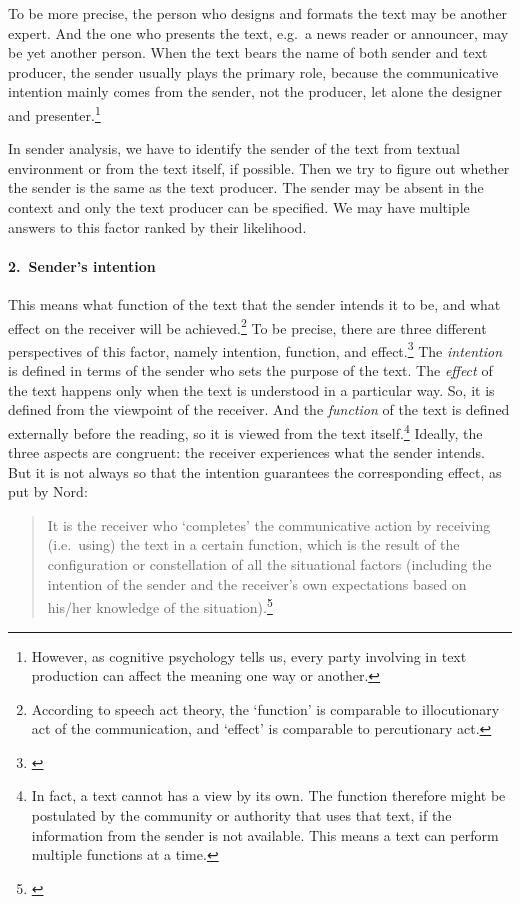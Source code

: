 To be more precise, the person who designs and formats the text may be another expert. And the one who presents the text, e.g.\ a news reader or announcer, may be yet another person. When the text bears the name of both sender and text producer, the sender usually plays the primary role, because the communicative intention mainly comes from the sender, not the producer, let alone the designer and presenter.\footnote{However, as cognitive psychology tells us, every party involving in text production can affect the meaning one way or another.}

In sender analysis, we have to identify the sender of the text from textual environment or from the text itself, if possible. Then we try to figure out whether the sender is the same as the text producer. The sender may be absent in the context and only the text producer can be specified. We may have multiple answers to this factor ranked by their likelihood.

\paragraph*{2.\ Sender's intention} This means what function of the text that the sender intends it to be, and what effect on the receiver will be achieved.\footnote{According to speech act theory, the `function' is comparable to illocutionary act of the communication, and `effect' is comparable to percutionary act.} To be precise, there are three different perspectives of this factor, namely intention, function, and effect.\footnote{\citealp[p.~53]{nord:analysis}} The \emph{intention} is defined in terms of the sender who sets the purpose of the text. The \emph{effect} of the text happens only when the text is understood in a particular way. So, it is defined from the viewpoint of the receiver. And the \emph{function} of the text is defined externally before the reading, so it is viewed from the text itself.\footnote{In fact, a text cannot has a view by its own. The function therefore might be postulated by the community or authority that uses that text, if the information from the sender is not available. This means a text can perform multiple functions at a time.} Ideally, the three aspects are congruent: the receiver experiences what the sender intends. But it is not always so that the intention guarantees the corresponding effect, as put by Nord:

\begin{quote}
It is the receiver who `completes' the communicative action by receiving (i.e.\ using) the text in a certain function, which is the result of the configuration or constellation of all the situational factors (including the intention of the sender and the receiver's own expectations based on his/her knowledge of the situation).\footnote{\citealp[p.~53]{nord:analysis}}
\end{quote}

